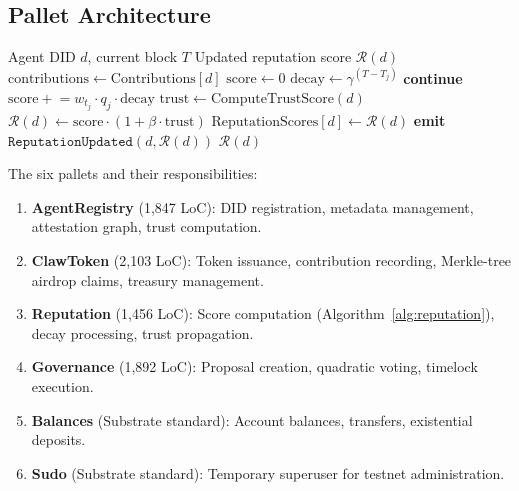 \documentclass[conference]{IEEEtran}
\begin{document}
\subsection{Pallet Architecture}

\begin{algorithm}[t]
\caption{Reputation Score Computation (On-Chain)}
\label{alg:reputation}
\begin{algorithmic}[1]
\REQUIRE Agent DID $d$, current block $T$
\ENSURE Updated reputation score $\mathcal{R}(d)$
\STATE $\text{contributions} \leftarrow \text{Contributions}[d]$
\STATE $\text{score} \leftarrow 0$
    \STATE $\text{decay} \leftarrow \gamma^{(T - T_j)}$ 
        \STATE \textbf{continue} 
    \ENDIF
    \STATE $\text{score} \mathrel{+}= w_{t_j} \cdot q_j \cdot \text{decay}$
\ENDFOR
\STATE $\text{trust} \leftarrow \text{ComputeTrustScore}(d)$ 
\STATE $\mathcal{R}(d) \leftarrow \text{score} \cdot (1 + \beta \cdot \text{trust})$ 
\STATE $\text{ReputationScores}[d] \leftarrow \mathcal{R}(d)$
\STATE \textbf{emit} $\texttt{ReputationUpdated}(d, \mathcal{R}(d))$
\RETURN $\mathcal{R}(d)$
\end{algorithmic}
\end{algorithm}

The six pallets and their responsibilities:

\begin{enumerate}
    \item \textbf{AgentRegistry} (1,847 LoC): DID registration, metadata management, attestation graph, trust computation.
    \item \textbf{ClawToken} (2,103 LoC): Token issuance, contribution recording, Merkle-tree airdrop claims, treasury management.
    \item \textbf{Reputation} (1,456 LoC): Score computation (Algorithm~\ref{alg:reputation}), decay processing, trust propagation.
    \item \textbf{Governance} (1,892 LoC): Proposal creation, quadratic voting, timelock execution.
    \item \textbf{Balances} (Substrate standard): Account balances, transfers, existential deposits.
    \item \textbf{Sudo} (Substrate standard): Temporary superuser for testnet administration.
\end{enumerate}
\end{document}
